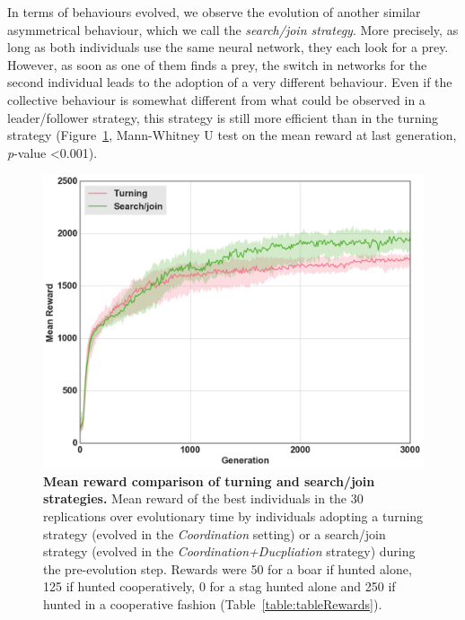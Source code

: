     In terms of behaviours evolved, we observe the evolution of another similar asymmetrical behaviour, which we call the \emph{search/join strategy}. More precisely, as long as both individuals use the same neural network, they each look for a prey. However, as soon as one of them finds a prey, the switch in networks for the second individual leads to the adoption of a very different behaviour. Even if the collective behaviour is somewhat different from what could be observed in a leader/follower strategy, this strategy is still more efficient than in the turning strategy (Figure~\ref{fig:fitnessRecyclingComNN}, Mann-Whitney U test on the mean reward at last generation, {\em p}-value \textless 0.001).

    \begin{figure}[h]
      \centering
        \includegraphics[width=0.75\linewidth]{fig/ArticleBio2/Fig8.png}
        \caption{\textbf{Mean reward comparison of turning and search/join strategies.}
        Mean reward of the best individuals in the $30$ replications over evolutionary time by individuals adopting a turning strategy (evolved in the \emph{Coordination} setting) or a search/join strategy (evolved in the \emph{Coordination+Ducpliation} strategy) during the pre-evolution step. Rewards were 50 for a boar if hunted alone, 125 if hunted cooperatively, 0 for a stag hunted alone and 250 if hunted in a cooperative fashion (Table~\ref{table:tableRewards}).}
      \label{fig:fitnessRecyclingComNN}
    \end{figure} 


